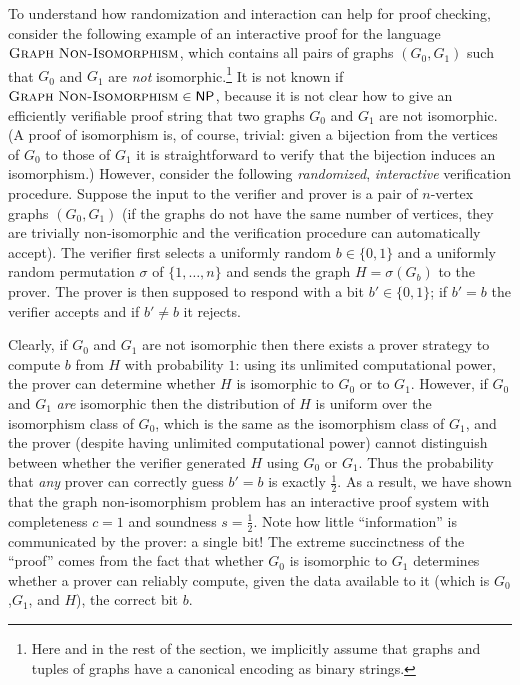 \documentclass[11pt]{article}
\theoremstyle{definition}
\newcommand{\GNI}{\textsc{Graph}~\textsc{Non}\textsc{-}\penalty-1000\textsc{Isomorphism}}
\newcommand{\class}[1]{\ensuremath{\mathsf{#1}}\xspace}
\newcommand{\NP}{\class{NP}} %
\begin{document}

To understand how randomization and interaction can help for proof checking, consider the following example of an interactive proof for the language $\GNI$, which contains all pairs of graphs $(G_0,G_1)$ such that $G_0$ and $G_1$ are \emph{not} isomorphic.\footnote{Here and in the rest of the section, we implicitly assume that graphs and tuples of graphs have a canonical encoding as binary strings.}
It is not known if $\GNI\in \NP$, because it is not clear how to give an efficiently verifiable proof string that two graphs $G_0$ and $G_1$ are not isomorphic. (A proof of isomorphism is, of course, trivial: given a bijection from the vertices of $G_0$ to those of $G_1$ it is straightforward to verify that the bijection induces an isomorphism.) However, consider the following \emph{randomized}, \emph{interactive} verification procedure. Suppose the input to the verifier and prover is a pair of $n$-vertex graphs $(G_0,G_1)$ (if the graphs do not have the same number of vertices, they are trivially non-isomorphic and the verification procedure can automatically accept). The verifier first selects a uniformly random $b\in \{0,1\}$ and a uniformly random permutation $\sigma$ of $\{1,\ldots,n\}$ and sends the graph $H = \sigma( G_b)$ to the prover. The prover is then supposed to respond with a bit $b'\in \{0,1\}$; if $b'=b$  the verifier accepts and if $b'\neq b$ it rejects. 

Clearly, if $G_0$ and $G_1$ are not isomorphic then there exists a prover {strategy} to compute $b$ from $H$ with probability $1$: using its unlimited computational power, the prover can determine whether $H$ is isomorphic to $G_0$ or to $G_1$. However, if $G_0$ and $G_1$ \emph{are} isomorphic then the distribution of $H$ is uniform over the isomorphism class of $G_0$, which is the same as the isomorphism class of $G_1$, and the prover (despite having unlimited computational power) cannot distinguish between whether the verifier generated $H$ using $G_0$ or $G_1$. Thus the probability that \emph{any} prover can correctly guess $b'=b$ is exactly $\frac{1}{2}$. As a result, we have shown that the graph non-isomorphism problem has an interactive proof system with completeness $c=1$ and soundness $s=\frac{1}{2}$. Note how little ``information'' is communicated by the prover: a single bit!
The extreme succinctness of the ``proof'' comes from the fact that whether $G_0$ is isomorphic to $G_1$ determines whether a prover can reliably compute, given the data available to it (which is $G_0$,$G_1$, and $H$), the correct bit $b$.
\end{document}
